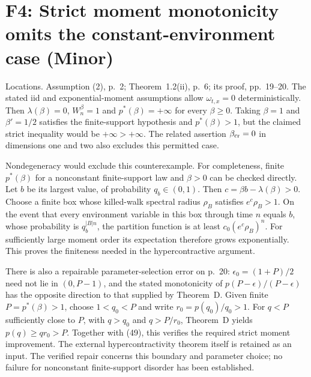 \documentclass[10pt]{article}
\begin{document}
\section*{F4: Strict moment monotonicity omits the constant-environment case (Minor)}
Locations. Assumption (2), p. 2; Theorem 1.2(ii), p. 6; its proof, pp. 19–20. The stated iid and exponential-moment assumptions allow \(\omega_{t,x}=0\) deterministically. Then \(\lambda(\beta)=0\), \(W_n^\beta=1\) and \(p^*(\beta)=+\infty\) for every \(\beta\geq0\). Taking \(\beta=1\) and \(\beta'=1/2\) satisfies the finite-support hypothesis and \(p^*(\beta)>1\), but the claimed strict inequality would be \(+\infty>+\infty\). The related assertion \(\beta_{\rm cr}=0\) in dimensions one and two also excludes this permitted case.\par
Nondegeneracy would exclude this counterexample. For completeness, finite \(p^*(\beta)\) for a nonconstant finite-support law and \(\beta>0\) can be checked directly. Let \(b\) be its largest value, of probability \(q_b\in(0,1)\). Then \(c=\beta b-\lambda(\beta)>0\). Choose a finite box whose killed-walk spectral radius \(\rho_B\) satisfies \(e^c\rho_B>1\). On the event that every environment variable in this box through time \(n\) equals \(b\), whose probability is \(q_b^{|B|n}\), the partition function is at least \(c_0(e^c\rho_B)^n\). For sufficiently large moment order its expectation therefore grows exponentially. This proves the finiteness needed in the hypercontractive argument.\par
There is also a repairable parameter-selection error on p. 20: \(\epsilon_0=(1+P)/2\) need not lie in \((0,P-1)\), and the stated monotonicity of \(p(P-\epsilon)/(P-\epsilon)\) has the opposite direction to that supplied by Theorem D. Given finite \(P=p^*(\beta)>1\), choose \(1<q_0<P\) and write \(r_0=p(q_0)/q_0>1\). For \(q<P\) sufficiently close to \(P\), with \(q>q_0\) and \(q>P/r_0\), Theorem D yields \(p(q)\geq q r_0>P\). Together with (49), this verifies the required strict moment improvement. The external hypercontractivity theorem itself is retained as an input. The verified repair concerns this boundary and parameter choice; no failure for nonconstant finite-support disorder has been established.\par
\end{document}
